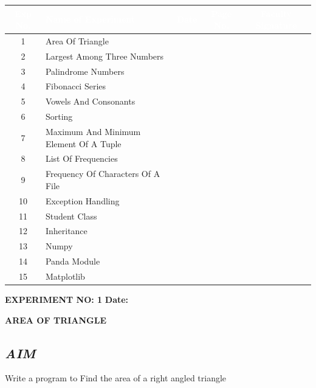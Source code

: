 \documentclass[11pt,a4paper]{article}
\begin{document}
\begin{table}[h!]
\centering
\begin{tabular}{|c|p{7.5cm}|c|c|c|}
\hline
\rowcolor{navyblue}
\textcolor{white}{\textbf{Exp No.}} & \textcolor{white}{\textbf{Name of Experiment}} & \textcolor{white}{\textbf{Date}} & \textcolor{white}{\textbf{Page No.}} & \textcolor{white}{\textbf{Faculty Signature}} \\
\hline
1 & Area Of Triangle & & & \\ \hline
\rowcolor{navyblue!5}
2 & Largest Among Three Numbers & & & \\ \hline
3 & Palindrome Numbers & & & \\ \hline
\rowcolor{navyblue!5}
4 & Fibonacci Series & & & \\ \hline
5 & Vowels And Consonants & & & \\ \hline
\rowcolor{navyblue!5}
6 & Sorting & & & \\ \hline
7 & Maximum And Minimum Element Of A Tuple & & & \\ \hline
\rowcolor{navyblue!5}
8 & List Of Frequencies & & & \\ \hline
9 & Frequency Of Characters Of A File & & & \\ \hline
\rowcolor{navyblue!5}
10 & Exception Handling & & & \\ \hline
11 & Student Class & & & \\ \hline
\rowcolor{navyblue!5}
12 & Inheritance & & & \\ \hline
13 & Numpy & & & \\ \hline
\rowcolor{navyblue!5}
14 & Panda Module & & & \\ \hline
15 & Matplotlib & & & \\ \hline
\end{tabular}
\end{table}

\newpage
\noindent
\textbf{\large EXPERIMENT NO: 1} \hfill \textbf{\large Date: \underline{\hspace{3cm}}}

\vspace{0.2cm}
\begin{center}
{\Huge \textbf{\textcolor{navyblue}{AREA OF TRIANGLE}}}
\end{center}
\vspace{0.3cm}

\subsection*{\textit{AIM}}
Write a program to Find the area of a right angled triangle
\end{document}
